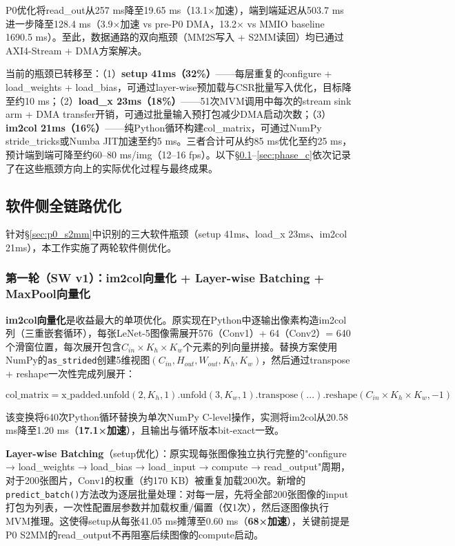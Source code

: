 \documentclass[12pt, a4paper]{article}
\begin{document}
P0优化将read\_out从257 ms降至19.65 ms（13.1×加速），端到端延迟从503.7 ms进一步降至128.4 ms（3.9×加速 vs pre-P0 DMA，13.2× vs MMIO baseline 1690.5 ms）。至此，数据通路的双向瓶颈（MM2S写入 + S2MM读回）均已通过AXI4-Stream + DMA方案解决。

当前的瓶颈已转移至：（1）\textbf{setup 41ms（32\%）}——每层重复的configure + load\_weights + load\_bias，可通过layer-wise预加载与CSR批量写入优化，目标降至约10 ms；（2）\textbf{load\_x 23ms（18\%）}——51次MVM调用中每次的stream sink arm + DMA transfer开销，可通过批量输入预打包减少DMA启动次数；（3）\textbf{im2col 21ms（16\%）}——纯Python循环构建col\_matrix，可通过NumPy stride\_tricks或Numba JIT加速至约5 ms。三者合计可从约85 ms优化至约25 ms，预计端到端可降至约60--80 ms/img（12--16 fps）。以下§\ref{sec:sw_optimization}--\ref{sec:phase_c}依次记录了在这些瓶颈方向上的实际优化过程与最终成果。

\subsection{软件侧全链路优化}
\label{sec:sw_optimization}

针对§\ref{sec:p0_s2mm}中识别的三大软件瓶颈（setup 41ms、load\_x 23ms、im2col 21ms），本工作实施了两轮软件侧优化。

\subsubsection{第一轮（SW v1）：im2col向量化 + Layer-wise Batching + MaxPool向量化}

\textbf{im2col向量化}是收益最大的单项优化。原实现在Python中逐输出像素构造im2col列（三重嵌套循环），每张LeNet-5图像需展开576（Conv1）+ 64（Conv2）= 640个滑窗位置，每次展开包含$C_{in}\times K_h\times K_w$个元素的列向量拼接。替换方案使用NumPy的\texttt{as\_strided}创建5维视图$(C_{in}, H_{out}, W_{out}, K_h, K_w)$，然后通过transpose + reshape一次性完成列展开：

\begin{equation}
    \text{col\_matrix} = \text{x\_padded.unfold}(2, K_h, 1).\text{unfold}(3, K_w, 1).\text{transpose}(...).\text{reshape}(C_{in}\times K_h\times K_w, -1)
\end{equation}

该变换将640次Python循环替换为单次NumPy C-level操作，实测将im2col从20.58 ms降至1.20 ms（\textbf{17.1×加速}），且输出与循环版本bit-exact一致。

\textbf{Layer-wise Batching}（setup优化）：原实现每张图像独立执行完整的"configure → load\_weights → load\_bias → load\_input → compute → read\_output"周期，对于200张图片，Conv1的权重（约170 KB）被重复加载200次。新增的\texttt{predict\_batch()}方法改为逐层批量处理：对每一层，先将全部200张图像的input打包为列表，一次性配置层参数并加载权重/偏置（仅1次），然后逐图像执行MVM推理。这使得setup从每张41.05 ms摊薄至0.60 ms（\textbf{68×加速}），关键前提是P0 S2MM的read\_output不再阻塞后续图像的compute启动。
\end{document}
